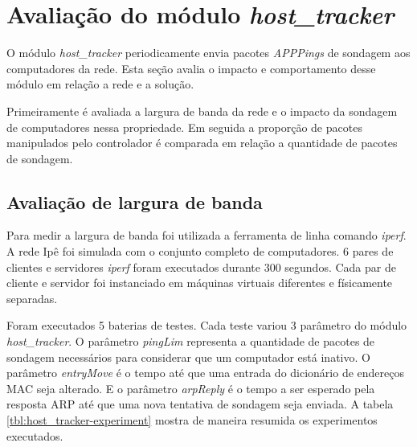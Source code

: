 \break
\section{Avaliação do módulo \emph{host\_tracker}}

O módulo \emph{host\_tracker} periodicamente envia pacotes \emph{APPPings} de
sondagem aos computadores da rede. 
Esta seção avalia o impacto e comportamento desse módulo em relação a rede e 
a solução.

Primeiramente é avaliada a largura de banda da rede e o impacto da sondagem 
de computadores nessa propriedade.
Em seguida a proporção de pacotes manipulados pelo controlador é comparada
em relação a quantidade de pacotes de sondagem.

\subsection{Avaliação de largura de banda}

Para medir a largura de banda foi utilizada a ferramenta de linha comando
\emph{iperf}.
A rede Ipê foi simulada com o conjunto completo de computadores.
6 pares de clientes e servidores \emph{iperf} foram executados durante 300 
segundos.
Cada par de cliente e servidor foi instanciado em máquinas virtuais 
diferentes e físicamente separadas.



Foram executados 5 baterias de testes.
Cada teste variou 3 parâmetro do módulo \emph{host\_tracker}.
O parâmetro \emph{pingLim} representa a quantidade de pacotes de sondagem 
necessários para considerar que um computador está inativo.
O parâmetro \emph{entryMove} é o tempo até que uma entrada do dicionário de 
endereços MAC seja alterado.
E o parâmetro \emph{arpReply} é o tempo a ser esperado pela resposta ARP até
que uma nova tentativa de sondagem seja enviada.
A tabela \ref{tbl:host_tracker-experiment} mostra de maneira resumida os 
experimentos executados.

